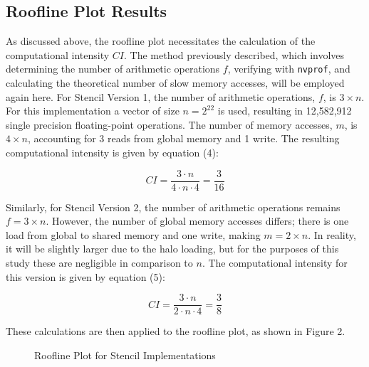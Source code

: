 \documentclass{article}
\begin{document}
\subsection{Roofline Plot Results}

As discussed above, the roofline plot necessitates the calculation of the computational intensity \(CI\). The method previously described, which involves determining the number of arithmetic operations \(f\), verifying with \texttt{nvprof}, and calculating the theoretical number of slow memory accesses, will be employed again here. For Stencil Version 1, the number of arithmetic operations, \(f\), is \(3 \times n\). For this implementation a vector of size \(n = 2^{22}\) is used, resulting in 12,582,912 single precision floating-point operations. The number of memory accesses, \(m\), is \(4 \times n\), accounting for 3 reads from global memory and 1 write. The resulting computational intensity is given by equation (4):

\begin{equation}
    CI = \frac{3 \cdot n}{4 \cdot n \cdot 4} = \frac{3}{16}
\end{equation}

\bigskip
\noindent
Similarly, for Stencil Version 2, the number of arithmetic operations remains \(f = 3 \times n\). However, the number of global memory accesses differs; there is one load from global to shared memory and one write, making \(m = 2 \times n\). In reality, it will be slightly larger due to the halo loading, but for the purposes of this study these are negligible in comparison to $n$. The computational intensity for this version is given by equation (5):

\begin{equation}
    CI = \frac{3 \cdot n}{2 \cdot n \cdot 4} = \frac{3}{8}
\end{equation}

\noindent
These calculations are then applied to the roofline plot, as shown in Figure 2.

\begin{figure}[!htb]
    \centering
    \caption{Roofline Plot for Stencil Implementations}
\end{figure}
\end{document}
